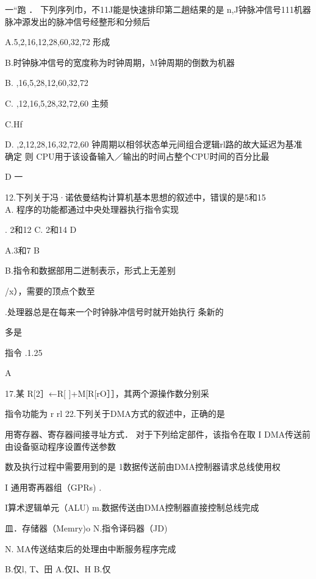     一“跑 ． 下列序列巾，不11J能是快速排印第二趟结果的是    n,J钟脉冲信号111机器脉冲源发出的脉冲信号经整形和分频后

    A.5,2,16,12,28,60,32,72    形成

    B.时钟脉冲信号的宽度称为时钟周期，M钟周期的倒数为机器

    B. ,16,5,28,12,60,32,72

    C. ,12,16,5,28,32,72,60    主频

    C.Hf

    D. ,2,12,28,16,32,72,60    钟周期以相邻状态单元间组合逻辑rl路的故大延迟为基准    确定    则 CPU用于该设备输入／输出的时间占整个CPU时间的百分比最

   D    一




12.下列关于冯·诺依曼结构计算机基本思想的叙述中，错误的是5和15 \\
A. 程序的功能都通过中央处理器执行指令实现

    . 2和12    C. 2和14    D

  A.3和7    B

    B.指令和数据部用二迸制表示，形式上无差别

    /x），需要的顶点个数至


    .处理器总是在每来一个时钟脉冲信号时就开始执行  条新的

    多是

    指令    .1.25%

    A

17.某    R[2］←R[ ]+M[R[rO］］，其两个源操作数分别采

    指令功能为   r    rl    22.下列关于DMA方式的叙述中，正确的是

   用寄存器、寄存器间接寻址方式． 对于下列给定部件，该指令在取    I DMA传送前由设备驱动程序设置传送参数

   数及执行过程中需要用到的是    1数据传送前由DMA控制器请求总线使用权

   I 通用寄再器组（GPRs)    .

    I算术逻辑单元（ALU)    m.数据传送由DMA控制器直接控制总线完成

   皿．存储器（Memry)o    N.指令译码器（JD)

    N. MA传送结束后的处理由中断服务程序完成

    B.仅l, T、田    A.仅I、H    B.仅

